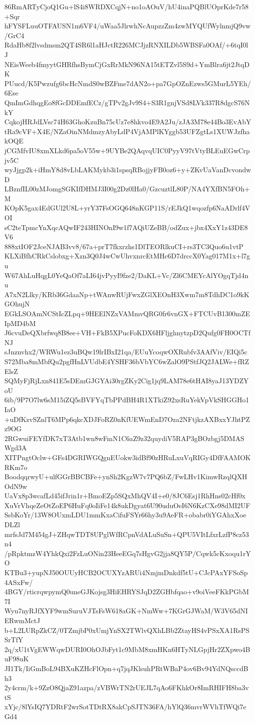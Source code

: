 86RmARTyCjoQ1Gu+lS4i8WRDXCqjN+no1oAOuV/hU4inaPQBlUOprKde7r58+Sqr
hFYSFLuuOTFAUSN1m6VF4/uWaa5JlrwhNcAupzzZm4zwMYQUfWylnmjQ9vw/GrC4
RdaHb8f2lvsdmsm2QT4SR6l1aHJctR226MCJjzRNXILDb5WBSFa0OAf/+6tqI0lJ
NEisWeeb4fmyytGHRfhsBymCjGxRrMkN96NA15tETZvl5S9d+YmBlra6jt2JtqDK
PUucd/K5Pwzufg6bcHcNmdS0wBZFme7dAN2o+pa7GpOZnEzws5GMurL5YEh/6Ese
QmImGdhqgEo8fGcDDEmfECz/gTPv2gJv9S4+S3R1gnjVSd8LVk337R8dgcS76NkY
CqkojHRJdLVsc74H63GhoKzuBn75cUz7e8hkvo4E9A2Ju/zJA3M78e44Bo3EvAbY
tRa9cVF+X4E/NZaOinNMdmzyAbyLdP4VjAMPlKYggb53UFZgtLs1XUWJzfhakOQE
jCGMfvIU8xmXLkd6pa5oV55w+9UYBe2QAqvqUIC0PyyV97tVtyBLEuEGwCrpjv5C
wyJjgp2k+iHmY8d8vLbLAKMykb3i1spsqRBojjyFB0oz6+y+ZKvUaVanDcvondwD
LBznfIL00zMJomgSGKIfDHMJ3I00g2Dz0lHa0/GzcuztlL80P/NA4YXfBN5FOh+M
KOpK5gax4EdGUl2U8L+yrY37FsOGQ648nKGP11S/rEJkQ1wqozfp6NaADrlf4VOI
sC2teTpmcYnXqcAQwIF243HINOnI9w1f7AQiUZeBB/odZux+jbx4XxY1z43DE8V6
888xtIOF2JceNJAB3vv8/67a+prT7fkxrzhs1DlTEORlkuCI+rs3TC3Quo6u1vtP
KLXiBfhCRkCslobxg+Xzn3Q0J4wCwUhvxnrcEtMHc6D7drccX0Yag017M1x+l7gu
W67AhLuHqgL0YeQaOf7aLI64jvPyyI9fze2/DaKL+Vc/Zl6CMEYcAlYOgqTjd4nu
A7xN2Llky/KRb36GdaaNp+tWAnwRUjFwxZGlXEOnH3Xwm7m8TdhDC1o9kKGOhujN
EGkLSOAmNCStIcZLpq+9HEElNZxVAMmvQRG0fr6vnGX+FTCUvB1300mZEIpMD4bM
J6cvuDeQXbrfwq8B8ee+VH+FkB5XPucFoKDX6HFljghnytzpD2Qufg0FH0OCTfNJ
sJnznvhx2/WRWu1ez3uBQw19lrIBxI21qa/EUuYcoqwOXRubfv3AAfViv/EIQi5c
S72Mba8mMbfQu2pgfHnLVUdbE4YSHF36bVbYC6wZalO9PStfJQ2JALWe+fRZElsZ
SQMyFjRjLxn841E5sDEmGJGYAi30rgZKy2Cig1jq9LAM78e6tHAI8yaJ13YDZYoU
6ib/9P7O7lw6sM15iZQ5sBVFYqTbPPdBH4R1XTkiZ92xsRuYekVpVkSHGGHo1IaO
+uDfKzvSZnlT6MPp6qkcXDJFoRZ0nKfUEWmEnD7Oza2NFtjkzAXBxxYJhtPZz9OG
2RGwuiFEYfDK7xT3Atb1wn8wFmN1C6aZ9z32quydiV5RAP3gBOzbgj5DMASWgd3A
XITPngtOclw+GFs4DGRIWGQgnEUokw3idBf90zHRuLxuVqRIGy4DfFAAMOKRKm7o
BoodqqrwyU+ulfGGrBBCBFe+ynSh2KgzW7v7PQ6bZ/FwLHv1KimwRzqlQXHOdN9w
UaVx8p3wcafLd45ifJrin1r+BmoEZp5SQxMhQV4I+e0/8JC6Esj1RhHns02cHf0x
XuVrVhqeZeOtZoEP6HuFq0oIiFe14k8ukDgyat6U90uduOeI6N6KzCXe98dMI2UF
SsbKoYr/13W8OUxmLDU1mmKxaCifuFSYr66hy3u9AeFR+obabr0iYGAhxXoeDLZl
mrfsJd7M454gJ+ZHqwTDT8UPglWfRCpnVdALuSuSn+QPU5VItLfxrLzfP8cz53n4
/pRpktmzW4YhkQxi2FzLuONin23HeeEGq7sHgvG2jja8QY5P/Cqwk5cKxoqu1rYO
KTBu3+yupNJ50OUUyHCB2OCUXYzARUi4NmjmDnkdf5tU+CJcPAxYFSoSp4ASxFw/
4BGY/rticrqwpymQ0uneGJKojsg3HiEHRYSJqD2ZGHbfqao+v9oiVeeFKkPGbM7I
Wyu7nyRJfXYF9wmSuruVJTsFsW618aGK+NmWw+7KGrGJWaM/W3V65dNIERwmMctJ
b+L2LURpZkCZ/0TZmjbP0xUmjYnSX2TWlvQXhLBb2ZtayHS4vPSxXA1RsPSSrTfY
2q/xU1tVgEWWqwDURI0OhOJbFyt1c9MbM8xmHKn6HTyNLGpjHr2ZXpwo4BuF98uK
JI1Tk/IiGmBoL94BXuKZHcFlOpn+q7jqJKlsuhPRtWBaP4ov6Bv94YdNQsccdBh3
2y4crm/k+9ZzO8QjaZ91azpa/zVBWrTN2rUEJL7qAo6FKhkOr8ImRHIFH8ba3vtS
xYjc/8lYsIQ7YDRtF2wrSotTDtRX8akCpSJTN36FA/hYlQ36mvrWVhTfWQi7eGd4
